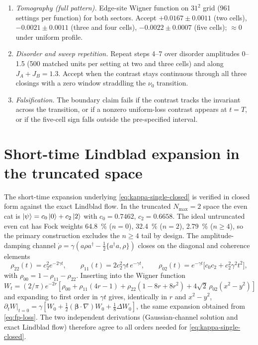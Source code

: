 \documentclass[aps,pra,preprint,superscriptaddress,amsmath,amssymb]{revtex4-2}
\begin{document}
\begin{enumerate}
\item \emph{Tomography (full pattern).} Edge-site Wigner function on $\num{31}^2$ grid (\num{961} settings per function) for both sectors. Accept $+\num{0.0167}\pm\num{0.0011}$ (two cells), $-\num{0.0021}\pm\num{0.0011}$ (three and four cells), $-\num{0.0022}\pm\num{0.0007}$ (five cells); $\approx\num{0}$ under uniform profile.
\item \emph{Disorder and sweep repetition.} Repeat steps 4--7 over disorder amplitudes \num{0}--\num{1.5} (\num{500} matched units per setting at two and three cells) and along $J_A+J_B=\num{1.3}$. Accept when the contrast stays continuous through all three closings with a zero window straddling the $\nu_0$ transition.
\item \emph{Falsification.} The boundary claim fails if the contrast tracks the invariant across the transition, or if a nonzero uniform-loss contrast appears at $t=T$, or if the five-cell sign falls outside the pre-specified interval.
\end{enumerate}

\section{Short-time Lindblad expansion in the truncated space}
\label{sec:fp-check}

The short-time expansion underlying \eqref{eq:kappa-single-closed} is verified in closed form against the exact Lindblad flow. In the truncated $N_{\max}=\num{2}$ space the even cat is $\ket{\psi}=c_0\ket{0}+c_2\ket{2}$ with $c_0=\num{0.7462}$, $c_2=\num{0.6658}$. The ideal untruncated even cat has Fock weights \qty{64.8}{\percent} ($n=\num{0}$), \qty{32.4}{\percent} ($n=\num{2}$), \qty{2.79}{\percent} ($n\ge\num{4}$), so the primary construction excludes the $n\ge\num{4}$ tail by design. The amplitude-damping channel $\dot\rho=\gamma(a\rho a^\dagger-\tfrac12\{a^\dagger a,\rho\})$ closes on the diagonal and coherence elements
\begin{equation}\label{eq:lindblad-trunc}
  \rho_{22}(t)=c_2^2e^{-2\gamma t},\qquad
  \rho_{11}(t)=2c_2^2\gamma t\,e^{-\gamma t},\qquad
  \rho_{02}(t)=e^{-\gamma t}\bigl[c_0c_2+c_2^2\gamma^2t^2\bigr],
\end{equation}
with $\rho_{00}=1-\rho_{11}-\rho_{22}$. Inserting into the Wigner function $W_t=(2/\pi)e^{-2r}[\rho_{00}+\rho_{11}(4r-1)+\rho_{22}(1-8r+8r^2)+4\sqrt2\,\rho_{02}(x^2-y^2)]$ and expanding to first order in $\gamma t$ gives, identically in $r$ and $x^2-y^2$, $\partial_t W|_{t=0}=\gamma[W_0+\tfrac12(\boldsymbol\beta\cdot\nabla)W_0+\tfrac18\Delta W_0]$, the same expansion obtained from \eqref{eq:fp-loss}. The two independent derivations (Gaussian-channel solution and exact Lindblad flow) therefore agree to all orders needed for \eqref{eq:kappa-single-closed}.
\end{document}
